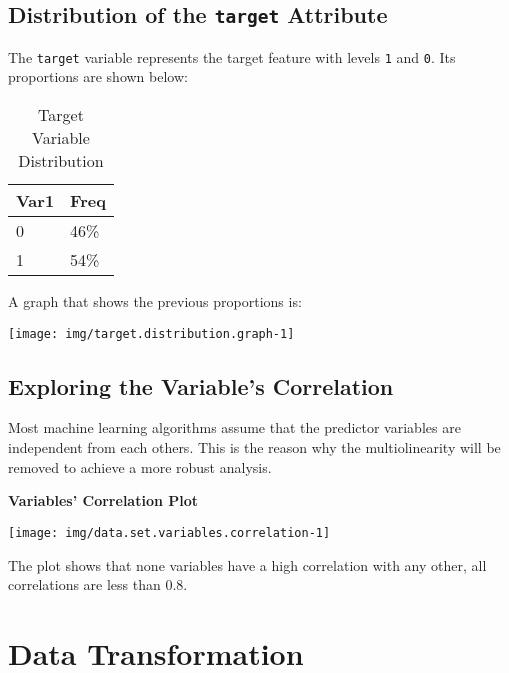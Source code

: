 \documentclass[]{article}
\begin{document}
\hypertarget{distribution-of-the-target-attribute}{%
\subsection{\texorpdfstring{Distribution of the \texttt{target}
Attribute}{Distribution of the target Attribute}}\label{distribution-of-the-target-attribute}}

The \texttt{target} variable represents the target feature with levels
\texttt{1} and \texttt{0}. Its proportions are shown below:

\begin{table}[!h]

\caption{\label{tab:target.distribution}Target Variable Distribution}
\centering
\begin{tabular}{ll}
\toprule
Var1 & Freq\\
\midrule
\rowcolor{gray!6}  0 & 46\%\\
1 & 54\%\\
\bottomrule
\end{tabular}
\end{table}

A graph that shows the previous proportions is:

\begin{center}\texttt{[image: img/target.distribution.graph-1]} \end{center}

\hypertarget{exploring-the-variables-correlation}{%
\subsection{Exploring the Variable's
Correlation}\label{exploring-the-variables-correlation}}

Most machine learning algorithms assume that the predictor variables are
independent from each others. This is the reason why the multiolinearity
will be removed to achieve a more robust analysis.

\textbf{Variables' Correlation Plot}

\begin{center}\texttt{[image: img/data.set.variables.correlation-1]} \end{center}

The plot shows that none variables have a high correlation with any
other, all correlations are less than 0.8.

\hypertarget{data-transformation}{%
\section{Data Transformation}\label{data-transformation}}
\end{document}
